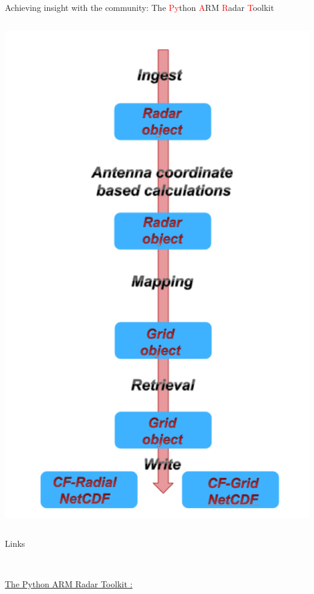 \documentclass[final]{beamer}
\begin{document}
\begin{frame}{}
\begin{columns}[t]
\begin{column}{.3\linewidth}
\begin{block}{Achieving insight with the community: The \textcolor{red}{Py}thon \textcolor{red}{A}RM \textcolor{red}{R}adar \textcolor{red}{T}oolkit}
\begin{columns}[t]
\begin{column}{.4\linewidth}
                       \includegraphics[width=0.9\linewidth]{figures/pyart-flow}\\[1ex]   
                   \end{column}
               \end{columns}
                       \end{block}
        
         \begin{block}{Links}
         	\begin{columns}[c]
         		\begin{column}{.3\linewidth}
		   		\\
         			
         			{\small \hyperlink{http://arm-doe.github.io/pyart/}{The Python ARM Radar Toolkit :}} 
         	

\end{column}
\end{columns}
\end{block}
\end{column}
\end{columns}
\end{frame}
\end{document}
